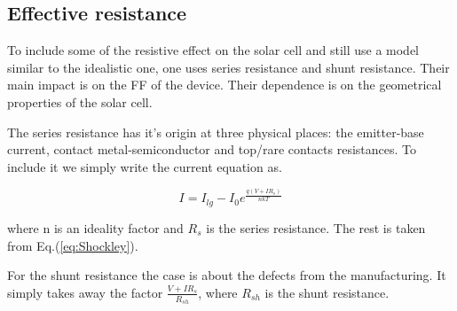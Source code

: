 \subsection{Effective resistance}

To include some of the resistive effect on the solar cell and still use a model similar to the idealistic one, one uses series resistance and shunt resistance. Their main impact is on the FF of the device. Their dependence is on the geometrical properties of the solar cell. 

The series resistance has it's origin at three physical places: the emitter-base current, contact metal-semiconductor and top/rare contacts resistances. To include it we simply write the current equation as. 

\begin{equation}
I=I_{lg} - I_0e^{\frac{q(V+IR_s)}{nkT}}
\end{equation}

where n is an ideality factor and $R_s$ is the series resistance. The rest is taken from Eq.(\ref{eq:Shockley}).

For the shunt resistance the case is about the defects from the manufacturing. It simply takes away the factor $\frac{V+IR_s}{R_{sh}}$, where $R_{sh}$ is the shunt resistance. \cite{pv}